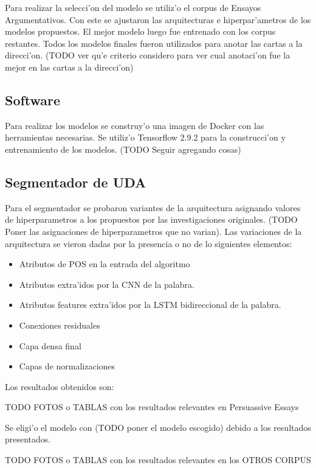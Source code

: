 Para realizar la selecci'on del modelo se utiliz'o el corpus de Ensayos Argumentativos. Con este se ajustaron
las arquitecturas e hiperpar'ametros de los modelos propuestos. El mejor modelo luego fue entrenado con los
corpus restantes. Todos los modelos finales fueron utilizados para anotar las cartas a la direcci'on. (TODO ver 
qu'e criterio considero para ver cual anotaci'on fue la mejor en las cartas a la direcci'on)

\subsection{Software}

Para realizar los modelos se construy'o una imagen de Docker con las herramientas necesarias. Se utiliz'o 
Tensorflow 2.9.2 para la construcci'on y entrenamiento de los modelos. (TODO Seguir agregando cosas) 

\subsection{Segmentador de UDA}

Para el segmentador se probaron variantes de la arquitectura asignando valores de hiperparametros a los propuestos
por las investigaciones originales. (TODO Poner las asignaciones de hiperparametros que no varian). Las variaciones 
de la arquitectura se vieron dadas por la presencia o no de lo siguientes elementos:

\begin{itemize}
    \item Atributos de POS en la entrada del algoritmo
    \item Atributos extra'idos por la CNN de la palabra.
    \item Atributos features extra'idos por la LSTM bidireccional de la palabra.
    \item Conexiones residuales
    \item Capa densa final
    \item Capas de normalizaciones
\end{itemize}

Los resultados obtenidos son:

TODO FOTOS o TABLAS con los resultados relevantes en Persuassive Essays

Se eligi'o el modelo con (TODO poner el modelo escogido) debido a los resultados presentados.

TODO FOTOS o TABLAS con los resultados relevantes en los OTROS CORPUS

